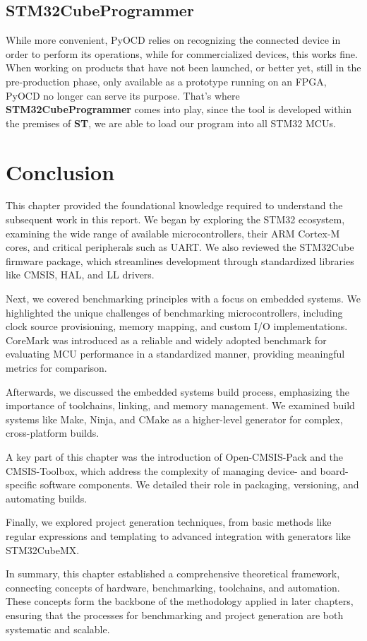 \subsection{STM32CubeProgrammer}
While more convenient, PyOCD relies on recognizing the connected device in order to perform its operations, while for commercialized devices, this works fine. When working on products that have not been launched, or better yet, still in the pre-production phase, only available as a prototype running on an FPGA, PyOCD no longer can serve its purpose.
That's where \textbf{STM32CubeProgrammer} comes into play, since the tool is developed within the premises of \textbf{ST}, we are able to load our program into all STM32 MCUs.
\section*{Conclusion}
This chapter provided the foundational knowledge required to understand the subsequent work in this report. We began by exploring the STM32 ecosystem, examining the wide range of available microcontrollers, their ARM Cortex-M cores, and critical peripherals such as UART. We also reviewed the STM32Cube firmware package, which streamlines development through standardized libraries like CMSIS, HAL, and LL drivers.

Next, we covered benchmarking principles with a focus on embedded systems. We highlighted the unique challenges of benchmarking microcontrollers, including clock source provisioning, memory mapping, and custom I/O implementations. CoreMark was introduced as a reliable and widely adopted benchmark for evaluating MCU performance in a standardized manner, providing meaningful metrics for comparison.

Afterwards, we discussed the embedded systems build process, emphasizing the importance of toolchains, linking, and memory management. We examined build systems like Make, Ninja, and CMake as a higher-level generator for complex, cross-platform builds.

A key part of this chapter was the introduction of Open-CMSIS-Pack and the CMSIS-Toolbox, which address the complexity of managing device- and board-specific software components. We detailed their role in packaging, versioning, and automating builds.

Finally, we explored project generation techniques, from basic methods like regular expressions and templating to advanced integration with generators like STM32CubeMX.

In summary, this chapter established a comprehensive theoretical framework, connecting concepts of hardware, benchmarking, toolchains, and automation. These concepts form the backbone of the methodology applied in later chapters, ensuring that the processes for benchmarking and project generation are both systematic and scalable.
